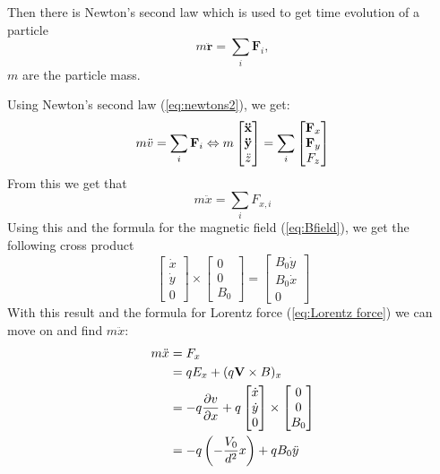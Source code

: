 \documentclass[english,notitlepage,reprint,nofootinbib]{revtex4-1}  %
\begin{document}
	Then there is Newton’s second law which is used to get time evolution of a particle
	\begin{equation} \label{eq:newtons2}
		m\ddot{\mathbf{r}} = \sum_i \mathbf{F}_i,
	\end{equation}
	$m$ are the particle mass.

	Using Newton’s second law (\ref{eq:newtons2}), we get:
	\begin{equation*}
		m \ddot{v} = \sum_i \vectorbold{F}_i \Leftrightarrow m
		\begin{bmatrix}
			\vectorbold{\ddot{x}} \\
			\vectorbold{\ddot{y}} \\
			\ddot{z}
		\end{bmatrix}
		= \sum_i
		\begin{bmatrix}
			\vectorbold{F}_x \\
			\vectorbold{F}_y \\
			F_z
		\end{bmatrix}
	\end{equation*}
	From this we get that 
	\begin{equation*}
		m \ddot{x} = \sum_i F_{x,i}
	\end{equation*}
	Using this and the formula for the magnetic field (\ref{eq:Bfield}), we get the following cross product
	\begin{equation*}
		\begin{bmatrix}
			\dot{x} \\
			\dot{y} \\
			0
		\end{bmatrix}
		\times
		\begin{bmatrix}
			0\\
			0 \\
			B_0
		\end{bmatrix}
		=
		\begin{bmatrix}
			B_0 \dot{y} \\
			B_0 \dot{x} \\
			0
		\end{bmatrix}
	\end{equation*}
	With this result and the formula for Lorentz force (\ref{eq:Lorentz force}) we can move on and find $m \ddot{x}$:
	\begin{align*}
		m \ddot{x} &= F_x \\
		&= q E_x + (q \vectorbold{V} \times B)_x \\
		&= -q \frac{\partial v}{\partial x} + q
		\begin{bmatrix}
			\dot{x} \\
			\dot{y} \\
			0
		\end{bmatrix}
		\times
		\begin{bmatrix}
			0 \\
			0 \\
			B_0
		\end{bmatrix} \\
		&= - q \left( - \frac{V_0}{d^2} x \right) + q B_0 \ddot{y} \\
	\end{align*}
\end{document}
